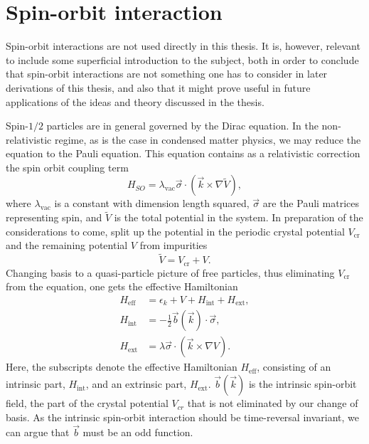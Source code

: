 \section{Spin-orbit interaction}\label{sec:spin-orbit}
Spin-orbit interactions are not used directly in this thesis.
It is, however, relevant to include some superficial introduction to the subject, both in order to conclude that spin-orbit interactions are not something one has to consider in later derivations of this thesis, and also that it might prove useful in future applications of the ideas and theory discussed in the thesis.

Spin-$1 /2$ particles are in general governed by the Dirac equation.
In the non-relativistic regime, as is the case in condensed matter physics, we may reduce the equation to the Pauli equation.
This equation contains as a relativistic correction the spin orbit coupling term~\cite{engelTheorySpinHall2007}
\begin{equation}
  \label{eq:pauli}
  H_{SO} = \lambda_{\text{vac}} \vec{\sigma} \cdot ( \vec{k} \times \nabla \tilde{V}),
\end{equation}
where $\lambda_{\text{vac}}$ is a constant with dimension length squared, $\vec{\sigma}$ are the Pauli matrices representing spin, and $\tilde{V}$ is the total potential in the system.
In preparation of the considerations to come, split up the potential in the periodic crystal potential $V_\text{cr}$ and the remaining potential $V$ from impurities
\begin{equation}
  \tilde{V} = V_{\text{cr}} + V.
\end{equation}
Changing basis to a quasi-particle picture of free particles, thus eliminating $V_\text{cr}$ from the equation, one gets the effective Hamiltonian~\cite{engelTheorySpinHall2007}
\begin{align}
  \label{eq:Heff}
  H_\text{eff} &= \epsilon_k + V + H_\text{int} + H_\text{ext},\\
  H_\text{int} &= -\frac12 \vec{b}(\vec{k}) \cdot \vec{\sigma},\\
  H_\text{ext} &= \lambda \vec{\sigma} \cdot( \vec{k} \times \nabla V).
\end{align}
Here, the subscripts denote the effective Hamiltonian $H_{\text{eff}}$, consisting of an intrinsic part, $H_{\text{int}}$, and an extrinsic part, $H_{\text{ext}}$.
$\vec{b}(\vec{k})$ is the intrinsic spin-orbit field, the part of the crystal potential $V_{cr}$ that is not eliminated by our change of basis.
As the intrinsic spin-orbit interaction should be time-reversal invariant, we can argue that $\vec{b}$ must be an odd function.
